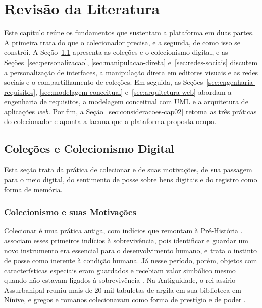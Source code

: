 \chapter{Revisão da Literatura}
\label{cap:02}

Este capítulo reúne os fundamentos que sustentam a plataforma em duas partes. A primeira trata do que o colecionador precisa, e a segunda, de como isso se
constrói. A Seção~\ref{sec:colecionismo} apresenta as coleções e o colecionismo digital, e as Seções~\ref{sec:personalizacao}, \ref{sec:manipulacao-direta}
e~\ref{sec:redes-sociais} discutem a personalização de interfaces, a manipulação direta em editores visuais e as redes sociais e o compartilhamento de coleções.
Em seguida, as Seções~\ref{sec:engenharia-requisitos}, \ref{sec:modelagem-conceitual} e~\ref{sec:arquitetura-web} abordam a engenharia de requisitos, a
modelagem conceitual com UML e a arquitetura de aplicações \textit{web}. Por fim, a Seção~\ref{sec:consideracoes-cap02} retoma as três práticas do
colecionador e aponta a lacuna que a plataforma proposta ocupa.


\section{Coleções e Colecionismo Digital}
\label{sec:colecionismo}

Esta seção trata da prática de colecionar e de suas motivações, de sua passagem para o meio digital, do sentimento de posse sobre bens digitais e do registro
como forma de memória.

\subsection{Colecionismo e suas Motivações}
\label{subsec:colecionismo-motivacoes}

Colecionar é uma prática antiga, com indícios que remontam à Pré-História \cite{CasadoRigalt2020,Sundstrom2020}.  associam
esses primeiros indícios à sobrevivência, pois identificar e guardar um novo instrumento era essencial para o desenvolvimento humano, e
 trata o instinto de posse como inerente à condição humana. Já nesse período, porém, objetos com características especiais
eram guardados e recebiam valor simbólico mesmo quando não estavam ligados à sobrevivência \cite{Oliveira2017}. Na Antiguidade, o rei assírio
Assurbanipal reuniu mais de 20 mil tabuletas de argila em sua biblioteca em Nínive, e gregos e romanos colecionavam como forma de prestígio e de poder
\cite{CasadoRigalt2020,Oliveira2017,Finardi2020}.

